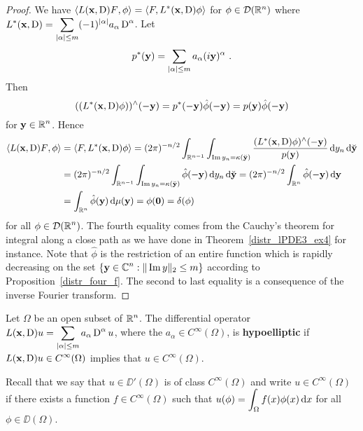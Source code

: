 \begin{proof}
 We have
$\displaystyle \left\langle{L(\mathbf{x},\operatorname{D}) F} , {\phi}\right\rangle
= \left\langle{F} , {L^\ast(\mathbf{x},\operatorname{D}) \phi}\right\rangle$
for $\phi \in \mathcal{D}(\mathbb{R}^n)$ where
$\displaystyle L^\ast(\mathbf{x},\operatorname{D})
= \sum_{|\alpha|\leq m} (-1)^{|\alpha|} a_\alpha \operatorname{D}^{\alpha}$.
Let
\[
p^\ast(\mathbf{y}) = \sum_{|\alpha|\leq m} a_\alpha (i \mathbf{y})^\alpha \ .
\]
Then
\[
((L^\ast(\mathbf{x},\operatorname{D}) \phi))^\wedge(-\mathbf{y})
= p^\ast(-\mathbf{y}) \hat{\phi}(-\mathbf{y})
= p(\mathbf{y}) \hat{\phi}(-\mathbf{y})
\]
for $\displaystyle \mathbf{y}\in \mathbb{R}^n$.  Hence
\begin{align*}
\left\langle{L(\mathbf{x},\operatorname{D})F} , {\phi}\right\rangle &= \left\langle{F} , {L^\ast(\mathbf{x},\operatorname{D})\phi}\right\rangle
= (2\pi)^{-n/2} \int_{\mathbb{R}^{n-1}} \int_{\operatorname{Im} y_n = \kappa(\breve{\mathbf{y}})}
\frac{(L^\ast(\mathbf{x},\operatorname{D})\phi)^\wedge(-\mathbf{y})}{p(\mathbf{y})}
\,\mathrm{d}{y_n}\,\mathrm{d}{\breve{\mathbf{y}}} \\
&= (2\pi)^{-n/2} \int_{\mathbb{R}^{n-1}} \int_{\operatorname{Im} y_n = \kappa(\breve{\mathbf{y}})}
\hat{\phi}(-\mathbf{y}) \,\mathrm{d}{y_n}\,\mathrm{d}{\breve{\mathbf{y}}}
= (2\pi)^{-n/2} \int_{\mathbb{R}^n} \hat{\phi}(-\mathbf{y}) \,\mathrm{d}{\mathbf{y}} \\
&= \int_{\mathbb{R}^n} \hat{\phi}(\mathbf{y}) \,\mathrm{d}{\mu(\mathbf{y})}
= \phi(\mathbf{0}) = \delta(\phi)
\end{align*}
for all $\displaystyle \phi \in \mathcal{D}(\mathbb{R}^n)$.  The fourth equality comes from
the Cauchy's theorem for integral along a close path as we have done 
in Theorem~\ref{distr_lPDE3_ex4} for instance.
Note that $\hat{\phi}$ is the restriction of an entire function which
is rapidly decreasing on the set
$\displaystyle \{ \mathbf{y} \in \mathbb{C}^n : \|\operatorname{Im} y\|_2 \leq m \}$ according to 
Proposition~\ref{distr_four_f}.  The second to last
equality is a consequence of the inverse Fourier transform.
\end{proof}

\begin{defn}
Let $\Omega$ be an open subset of $\displaystyle \mathbb{R}^n$.  The
differential operator
$\displaystyle L(\mathbf{x},\operatorname{D})u = \sum_{|\alpha|\leq m} a_\alpha \operatorname{D}^\alpha u$,
where the $\displaystyle a_\alpha\in C^\infty(\Omega)$, is
{\bfseries hypoelliptic}%
 if
$\displaystyle L(\mathbf{x},\operatorname{D})u \in C^\infty(\Omega)$ implies that
$\displaystyle u \in C^\infty(\Omega)$.
\end{defn}

Recall that we say that $u \in \DD'(\Omega)$ is of class
$\displaystyle C^\infty(\Omega)$ and write
$\displaystyle u \in C^\infty(\Omega)$ if there exists
a function $\displaystyle f \in C^\infty(\Omega)$ such that
$\displaystyle u(\phi) = \int_{\Omega} f(x) \phi(x) \,\mathrm{d}{x}$
for all $\phi \in \DD(\Omega)$.

